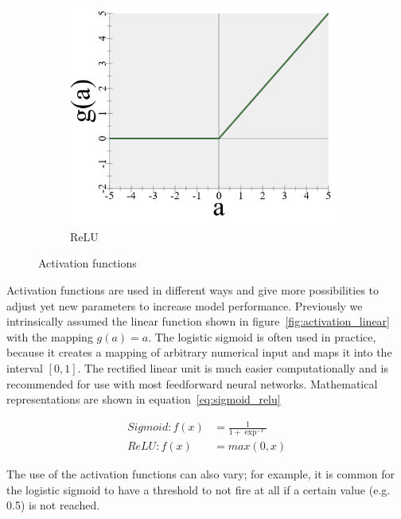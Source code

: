 \begin{figure}
\begin{subfigure}[b]{0.3\textwidth}
        \includegraphics[width=\textwidth]{images/4_relu.png}
        \caption{ReLU}
        \label{fig:activation_relu}
    \end{subfigure}
    \caption{Activation functions}
    \label{fig:activation}
\end{figure}

Activation functions are used in different ways and give more possibilities to adjust yet new parameters to increase model performance.
Previously we intrinsically assumed the linear function shown in figure~\ref{fig:activation_linear} with the mapping $g(a) = a$.
The logistic sigmoid is often used in practice, because it creates a mapping of arbitrary numerical input and maps it into the interval $[0,1]$.
The rectified linear unit is much easier computationally and is recommended for use with most feedforward neural networks\cite[p.169]{Goodfellow2017}\cite{Glorot2011}.
Mathematical representations are shown in equation~\eqref{eq:sigmoid_relu}

\begin{equation}
    \begin{split}
        Sigmoid: f(x) & = \frac{1}{1 + \exp^{-x}} \\ ReLU: f(x) & = max(0, x)
    \end{split}
    \label{eq:sigmoid_relu}
\end{equation}

The use of the activation functions can also vary; for example, it is common for the logistic sigmoid to have a threshold to not fire at all if a certain value (e.g. 0.5) is not reached.

